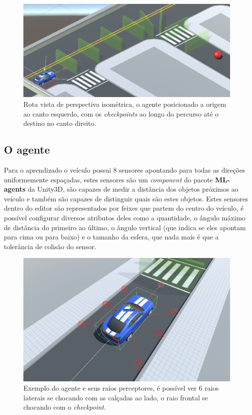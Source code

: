 \begin{figure}[h]
   \centering
   \includegraphics[scale=0.35]{figs/detalhe-rota.png}
    \caption{Rota vista de perspectiva isométrica, o agente posicionado a origem ao canto esquerdo, com os \textit{checkpoints} ao longo do percurso até o destino no canto direito.}
    \label{fig:route-view}
 \end{figure}

 \subsection{O agente}
 Para o aprendizado o veículo possui 8 sensores apontando para todas as direções uniformemente espaçadas, estes sensores são um \textit{component} do pacote \textbf{ML-agents} da Unity3D, são capazes de medir a distância dos objetos próximos ao veículo e também são capazes de distinguir quais são estes objetos. Estes sensores dentro do editor são representados por feixes que partem do centro do veículo, é possível configurar diversos atributos deles como a quantidade, o ângulo máximo de distância do primeiro ao último, o ângulo vertical (que indica se eles apontam para cima ou para baixo) e o tamanho da esfera, que nada mais é que a tolerância de colisão do sensor.

 \begin{figure}[h]
   \centering
   \includegraphics[scale=0.35]{figs/agente-raios-checkpoint.png}
    \caption{Exemplo do agente e seus raios perceptores, é possível ver 6 raios laterais se chocando com as calçadas ao lado, o raio frontal se chocando com o \textit{checkpoint}.}
    \label{fig:casting-rays}
 \end{figure}


